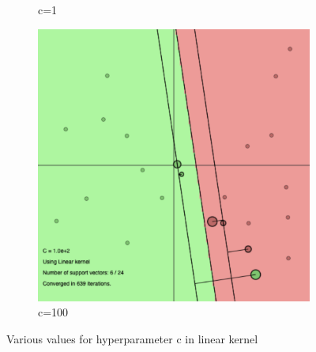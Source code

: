 \documentclass[a4paper, 11pt, one column]{article}
\begin{document}
\begin{figure}[]
\begin{subfigure}{0.33\linewidth}
        \caption{c=1}
    \end{subfigure}
    \begin{subfigure}{0.33\linewidth}
        \includegraphics[width=\linewidth]{images/lin_c_100.png}
        \caption{c=100}
    \end{subfigure}
    \caption{Various values for hyperparameter c in linear kernel}
    \label{fig:linear_c}
\end{figure}
\end{document}
